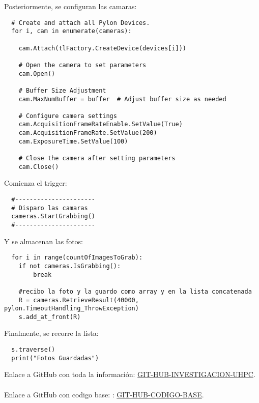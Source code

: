 \documentclass{article}
\begin{document}
Posteriormente, se configuran las camaras:

\begin{lstlisting}
  # Create and attach all Pylon Devices.
  for i, cam in enumerate(cameras):
      
    cam.Attach(tlFactory.CreateDevice(devices[i]))

    # Open the camera to set parameters
    cam.Open()

    # Buffer Size Adjustment
    cam.MaxNumBuffer = buffer  # Adjust buffer size as needed
    
    # Configure camera settings
    cam.AcquisitionFrameRateEnable.SetValue(True)
    cam.AcquisitionFrameRate.SetValue(200)
    cam.ExposureTime.SetValue(100) 

    # Close the camera after setting parameters
    cam.Close()
\end{lstlisting}

Comienza el trigger:

\begin{lstlisting}
  #----------------------
  # Disparo las camaras
  cameras.StartGrabbing()
  #----------------------
\end{lstlisting}

Y se almacenan las fotos:

\begin{lstlisting}
  for i in range(countOfImagesToGrab):
    if not cameras.IsGrabbing():
        break

    #recibo la foto y la guardo como array y en la lista concatenada
    R = cameras.RetrieveResult(40000, pylon.TimeoutHandling_ThrowException)
    s.add_at_front(R)
\end{lstlisting}

Finalmente, se recorre la lista:

\begin{lstlisting}
  s.traverse()
  print("Fotos Guardadas")
\end{lstlisting}


























\noindent Enlace a GitHub con toda la información: \href{https://github.com/LukasWolff2002/SINCRONIZACION_CAMARAS_BASLER}{GIT-HUB-INVESTIGACION-UHPC}.
\\ \\
\noindent Enlace a GitHub con codigo base: : \href{https://github.com/basler/pypylon/blob/master/samples/grabmultiplecameras.py}{GIT-HUB-CODIGO-BASE}.
\end{document}
